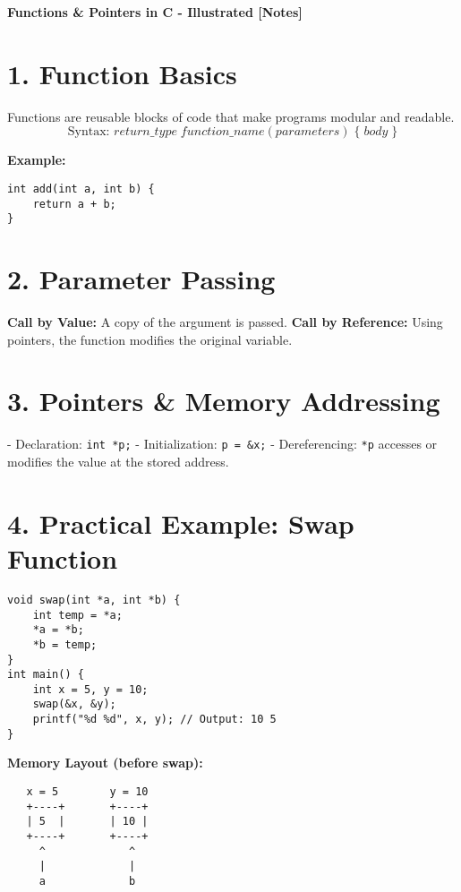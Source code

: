 \documentclass[a4paper,12pt]{article}
\begin{document}
\begin{center}
    {\LARGE \textbf{Functions \& Pointers in C - Illustrated \vspace{0.3cm} [Notes]}} \\
    \vspace{0.5cm}
\end{center}

\section*{1. Function Basics}
Functions are reusable blocks of code that make programs modular and readable.  
\[
\text{Syntax: } return\_type \; function\_name(parameters) \; \{ \; body \; \}
\]

\textbf{Example:}
\begin{lstlisting}
int add(int a, int b) {
    return a + b;
}
\end{lstlisting}

\section*{2. Parameter Passing}
\textbf{Call by Value:} A copy of the argument is passed.  
\textbf{Call by Reference:} Using pointers, the function modifies the original variable.  

\section*{3. Pointers \& Memory Addressing}
- Declaration: \verb|int *p;|  
- Initialization: \verb|p = &x;|  
- Dereferencing: \verb|*p| accesses or modifies the value at the stored address.

\section*{4. Practical Example: Swap Function}
\begin{lstlisting}
void swap(int *a, int *b) {
    int temp = *a;
    *a = *b;
    *b = temp;
}
int main() {
    int x = 5, y = 10;
    swap(&x, &y);
    printf("%d %d", x, y); // Output: 10 5
}
\end{lstlisting}

\textbf{Memory Layout (before swap):}
\begin{verbatim}
   x = 5        y = 10
   +----+       +----+
   | 5  |       | 10 |
   +----+       +----+
     ^             ^
     |             |
     a             b
\end{verbatim}
\end{document}
